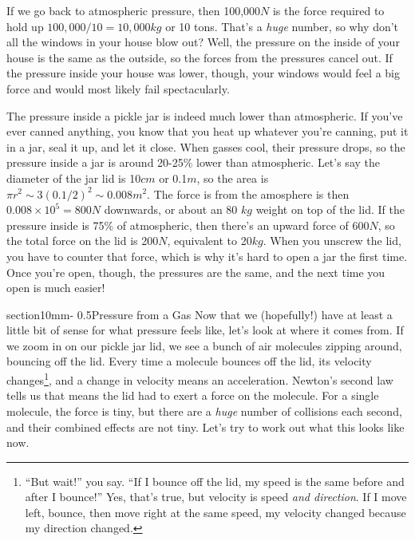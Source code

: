 \documentclass[letterpaper,11pt,preprint]{aastex}
\makeatletter
\renewcommand{\section}{\@startsection%
{section}{1}{0mm}{-\baselineskip}%
{0.5\baselineskip}{\normalfont\Large\bfseries}}%
\makeatother
\begin{document}
If we go back to atmospheric pressure, then 100,000$N$ is the force
required to hold up $100,000/10=10,000 kg$ or 10 tons.  That's a
\textit{huge} number, so why don't all the windows in your house blow
out?  Well, the pressure on the inside of your house is the same as
the outside, so the forces from the pressures cancel out.  If the
pressure inside your house was lower, though, your windows would feel
a big force and would most likely fail spectacularly.

The pressure inside a pickle jar is indeed much lower than
atmospheric.  If you've ever canned anything, you know that you heat
up whatever you're canning, put it in a jar, seal it up, and let it
close.  When gasses cool, their pressure drops, so the pressure inside
a jar is around 20-25\% lower than atmospheric.  Let's say the
diameter of the jar lid is 10$cm$ or 0.1$m$, so the area is $\pi r^2
\sim 3 (0.1/2)^2 \sim 0.008m^2$.  The force is from the amosphere is
then $0.008 \times 10^5 = 800N$ downwards, or about an 80 $kg$ weight on top of
the lid.  If the pressure inside is 75\% of atmospheric, then there's
an upward force of $600N$, so the total force on the lid is 200$N$,
equivalent to 20$kg$.  When you unscrew the lid, you have to counter
that force, which is why it's hard to open a jar the first time.  Once
you're open, though, the pressures are the same, and the next time you
open is much easier!

\section{Pressure from a Gas}
Now that we (hopefully!) have at least a little bit of sense for what
pressure feels like, let's look at where it comes from.  If we zoom in
on our pickle jar lid, we see a bunch of air molecules zipping around,
bouncing off the lid.  Every time a molecule bounces off the lid, its
velocity changes\footnote{``But wait!'' you say.  ``If I bounce off
the lid, my speed is the same before and after I bounce!''  Yes,
that's true, but velocity is speed \textit{and direction}.  If I move
left, bounce, then move right at the same speed, my velocity changed
because my direction changed.}, and a change in velocity means an acceleration.
Newton's second law tells us that means the lid had to exert a force
on the molecule.  For a single molecule, the force is tiny, but there
are a \textit{huge} number of collisions each second, and their
combined effects are not tiny.  Let's try to work out what this looks
like now.
\end{document}

